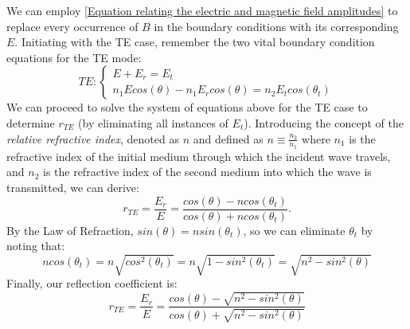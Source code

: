 We can employ \ref{Equation relating the electric and magnetic field amplitudes} to replace every occurrence of $B$ in the boundary conditions with its corresponding $E$. Initiating with the TE case, remember the two vital boundary condition equations for the TE mode:
\begin{equation}
TE:
\begin{cases} \label{TE boundary conditions}
  E + E_r = E_t \\
  n_1Ecos(\theta) - n_1E_rcos(\theta) = n_2E_tcos(\theta_t)
\end{cases}
\end{equation}
We can proceed to solve the system of equations above for the TE case to determine $r_{TE}$ (by eliminating all instances of $E_t$). Introducing the concept of the \textit{relative refractive index}, denoted as $n$ and defined as $n \equiv \frac{n_2}{n_1}$ where $n_1$ is the refractive index of the initial medium through which the incident wave travels, and $n_2$ is the refractive index of the second medium into which the wave is transmitted, we can derive:
\begin{equation} \label{Reflection coefficient (TE) in terms of n}
r_{TE} = \frac{E_r}{E} = \frac{cos(\theta) - ncos(\theta_t)}{cos(\theta) + ncos(\theta_t)}.
\end{equation}
By the Law of Refraction, $sin(\theta) = nsin(\theta_t)$, so we can eliminate $\theta_t$ by noting that:
\begin{equation} \label{Replacing \theta_t using the law of refraction}
ncos(\theta_t) = n \sqrt{cos^{2}(\theta_t)} = n\sqrt{1 - sin^2(\theta_t)} = \sqrt{n^2 - sin^2(\theta)}
\end{equation}
Finally, our reflection coefficient is:
\begin{equation} \label{eq:reflection_TE}
r_{TE} = \frac{E_r}{E} = \frac{cos(\theta) - \sqrt{n^2 - sin^2(\theta)}}{cos(\theta) + \sqrt{n^2 - sin^2(\theta)}}
\end{equation}

